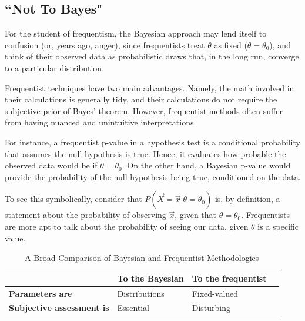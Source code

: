 \documentclass[12pt,twoside]{reedthesis}
\begin{document}
	\subsection*{``Not To Bayes"}
	For the student of frequentism, the Bayesian approach may lend itself to confusion (or, years ago, anger), since frequentists treat $\theta$ as fixed ($\theta = \theta_0$), and think of their observed data as probabilistic draws that, in the long run, converge to a particular distribution.
	
	Frequentist techniques have two main advantages. Namely, the math involved in their calculations is generally tidy, and their calculations do not require the subjective prior of Bayes' theorem. However, frequentist methods often suffer from having nuanced and unintuitive interpretations. 
	
	For instance, a frequentist p-value in a hypothesis test is a conditional probability that assumes the null hypothesis is true. Hence, it evaluates how probable the observed data would be if $\theta = \theta_0$. On the other hand, a Bayesian p-value would provide the probability of the null hypothesis being true, conditioned on the data. 
	
	To see this symbolically, consider that $P(\vec{X} = \vec{x} | \theta = \theta_0 )$ is, by definition, a statement about the probability of observing $\vec{x}$, given that $\theta = \theta_0$. Frequentists are more apt to talk about the probability of seeing our data, given $\theta$ is a specific value.

\begin{table}[htdp] %
\caption[Comparison of Bayesian and Frequentist Reasoning]{A Broad Comparison of Bayesian and Frequentist Methodologies} 
\begin{center}
\begin{tabular}{l l l l} 

   &  \textbf{To the Bayesian} & \textbf{To the frequentist} \\ %
  \midrule %
\textbf{Parameters are} & Distributions  & Fixed-valued \\ %
\textbf{Subjective assessment is} & Essential & Disturbing \\
\bottomrule %
\end{tabular}
\end{center}
\label{bvf} %
\end{table}
\end{document}
